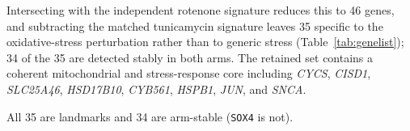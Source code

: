 \documentclass[5p,times,twocolumn]{elsarticle}
\begin{document}
Intersecting with the independent rotenone signature reduces this to 46 genes,
and subtracting the matched tunicamycin signature leaves 35 specific to the
oxidative-stress perturbation rather than to generic stress
(Table~\ref{tab:genelist}); 34 of the 35 are detected stably in both arms. The
retained set contains a coherent mitochondrial and stress-response core
including \textit{CYCS}, \textit{CISD1}, \textit{SLC25A46}, \textit{HSD17B10},
\textit{CYB561}, \textit{HSPB1}, \textit{JUN}, and \textit{SNCA}.

\begin{table}[!htbp]
  \centering
  \caption{The 35 rotenone-specific transferable genes: LINCS landmarks, detected in $\geq 10\%$ of DA-labelled D52 cells, differentially expressed under rotenone, and absent from the tunicamycin signature.}
  \label{tab:genelist}
  \begin{minipage}{\linewidth}\footnotesize
  All 35 are landmarks and 34 are arm-stable (\texttt{SOX4} is not).
  \end{minipage}
\end{table}
\end{document}
